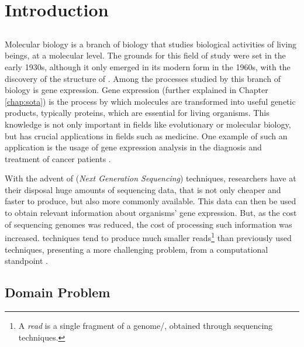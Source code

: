 \chapter{Introduction} \label{chap:intro}

\section*{}


Molecular biology is a branch of biology that studies biological activities of
living beings, at a molecular level. The grounds for this field of study were
set in the early 1930s, although it only emerged in its modern form in the
1960s, with the discovery of the structure of \dna. Among the processes studied
by this branch of biology is gene expression. Gene expression (further explained
in Chapter \ref{chap:sota}) is the process by which \dna{} molecules are
transformed into useful genetic products, typically proteins, which are
essential for living organisms. This knowledge is not only important in fields
like evolutionary or molecular biology, but has crucial applications in fields
such as medicine. One example of such an application is the usage of gene
expression analysis in the diagnosis and treatment of cancer patients
\cite{Pusztai01062003}.

With the advent of \ngs{} (\textit{Next Generation Sequencing}) techniques,
researchers have at their disposal huge amounts of sequencing data, that is not
only cheaper and faster to produce, but also more commonly available. This data
can then be used to obtain relevant information about organisms' gene
expression. But, as the cost of sequencing genomes was reduced, the cost of
processing such information was increased. \ngs{} techniques tend to produce
much smaller reads\footnote{A \textit{read} is a single fragment of a
genome/\trans, obtained through sequencing techniques.} than previously used
techniques, presenting a more challenging problem, from a computational
standpoint \cite{Wolf2013}.

\section{Domain Problem} \label{sec:problem}


